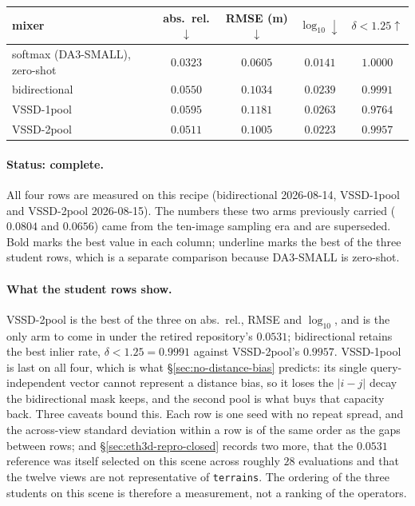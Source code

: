 \documentclass[11pt,a4paper]{article}
\begin{document}
\begin{center}
\begin{tabular}{lcccc}
\toprule
mixer & abs.\ rel.$\downarrow$ & RMSE (m)$\downarrow$ & $\log_{10}\downarrow$ & $\delta{<}1.25\uparrow$ \\
\midrule
softmax (DA3-SMALL), zero-shot & $\mathbf{0.0323}$ & $\mathbf{0.0605}$ & $\mathbf{0.0141}$ & $\mathbf{1.0000}$ \\
\midrule
bidirectional        & $0.0550$ & $0.1034$ & $0.0239$ & $0.9991$ \\
VSSD-1pool           & $0.0595$ & $0.1181$ & $0.0263$ & $0.9764$ \\
VSSD-2pool           & \underline{$0.0511$} & \underline{$0.1005$} & \underline{$0.0223$} & $0.9957$ \\
\bottomrule
\end{tabular}
\end{center}

\paragraph{Status: complete.} All four rows are measured on this recipe (bidirectional
2026-08-14, VSSD-1pool and VSSD-2pool 2026-08-15). The numbers these two arms previously carried
($0.0804$ and $0.0656$) came from the ten-image sampling era and are superseded. Bold marks the
best value in each column; underline marks the best of the three student rows, which is a
separate comparison because DA3-SMALL is zero-shot.

\paragraph{What the student rows show.} VSSD-2pool is the best of the three on abs.\ rel., RMSE and
$\log_{10}$, and is the only arm to come in under the retired repository's $0.0531$;
bidirectional retains the best inlier rate,
$\delta{<}1.25=0.9991$ against VSSD-2pool's $0.9957$. VSSD-1pool is last on all four, which is
what \S\ref{sec:no-distance-bias} predicts: its single query-independent vector cannot represent a
distance bias, so it loses the $|i-j|$ decay the bidirectional mask keeps, and the second pool is
what buys that capacity back. Three caveats bound this. Each row is one seed with no repeat spread,
and the across-view standard deviation within a row is of the same order as the gaps between rows;
and \S\ref{sec:eth3d-repro-closed} records two more, that the $0.0531$ reference was itself
selected on this scene across roughly $28$ evaluations and that the twelve views are not
representative of \texttt{terrains}. The
ordering of the three students on this scene is therefore a measurement, not a ranking of the
operators.
\end{document}
